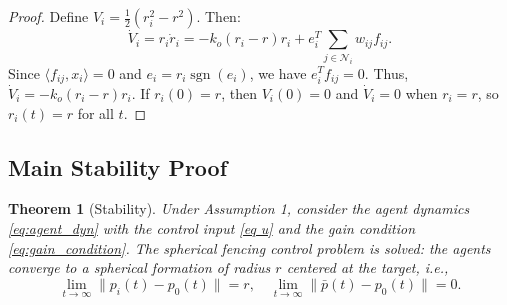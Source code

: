 \documentclass{ctexart}
\DeclareMathOperator{\sgn}{sgn}
\newtheorem{theorem}{Theorem}[section]
\begin{document}
\begin{proof}
Define $V_i = \frac{1}{2}(r_i^2 - r^2)$. Then:
\begin{equation}
\dot{V}_i = r_i \dot{r}_i = -k_o(r_i - r)r_i + e_i^T \sum_{j \in \mathcal{N}_i} w_{ij} f_{ij}.
\end{equation}
Since $\langle f_{ij}, x_i \rangle = 0$ and $e_i = r_i \sgn(e_i)$, we have $e_i^T f_{ij} = 0$.
Thus, $\dot{V}_i = -k_o(r_i - r)r_i$.
If $r_i(0) = r$, then $V_i(0) = 0$ and $\dot{V}_i = 0$ when $r_i = r$, so $r_i(t) = r$ for all $t$.
\end{proof}

\subsection*{Main Stability Proof}

\begin{theorem}[Stability]
Under Assumption 1, consider the agent dynamics \eqref{eq:agent_dyn} with the control input \eqref{eq u} and the gain condition \eqref{eq:gain_condition}.
The spherical fencing control problem is solved: the agents converge to a spherical formation of radius $r$ centered at the target, i.e.,
\begin{equation*}
\lim_{t \to \infty} \|p_i(t) - p_0(t)\| = r, \quad
\lim_{t \to \infty} \|\bar{p}(t) - p_0(t)\| = 0.
\end{equation*}
\end{theorem}
\end{document}
